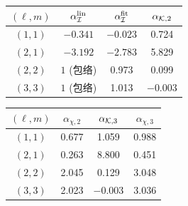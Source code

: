 \documentclass[UTF8,fontset=fandol,11pt,a4paper,oneside]{ctexart}
\numberwithin{equation}{section}
\begin{document}
\noindent\begin{minipage}{\linewidth}
\captionsetup{type=table}\caption{历史线性强度、非线性 Green 核和总响应的有效幂分解，待复核。}\label{audit:tab:cft-factorization}
\centering\fontsize{10}{13.5}\selectfont
\setlength{\tabcolsep}{6pt}\renewcommand{\arraystretch}{1.2}
\par{}\par\smallskip
\begin{tabular}{cccc}\toprule
$(\ell,m)$ & $\alpha_{\cal I}^{\rm lin}$ & $\alpha_{\cal I}^{\rm fit}$ & $\alpha_{{\cal K},2}$\\\midrule
$(1,1)$ & $-0.341$ & $-0.023$ & 0.724\\
$(2,1)$ & $-3.192$ & $-2.783$ & 5.829\\
$(2,2)$ & $1$ (包络) & 0.973 & 0.099\\
$(3,3)$ & $1$ (包络) & 1.013 & $-0.003$\\
\bottomrule\end{tabular}
\par\medskip
\par{}\par\smallskip
\begin{tabular}{cccc}\toprule
$(\ell,m)$ & $\alpha_{\chi,2}$ & $\alpha_{{\cal K},3}$ & $\alpha_{\chi,3}$\\\midrule
$(1,1)$ & 0.677 & 1.059 & 0.988\\
$(2,1)$ & 0.263 & 8.800 & 0.451\\
$(2,2)$ & 2.045 & 0.129 & 3.048\\
$(3,3)$ & 2.023 & $-0.003$ & 3.036\\
\bottomrule\end{tabular}
\end{minipage}\par\addvspace{10pt}
\par\addvspace{14pt}
\end{document}

